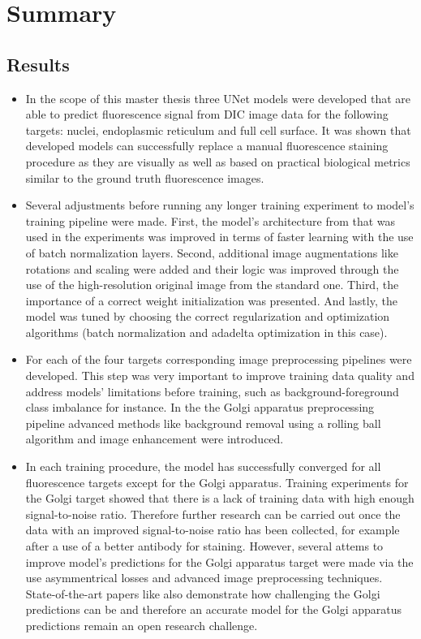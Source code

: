 \section{Summary}
\subsection{Results}
\begin{itemize}
    \item In the scope of this master thesis three UNet models were developed that are able to predict fluorescence signal from DIC image data for the following targets: nuclei, endoplasmic reticulum and full cell surface. It was shown that developed models can successfully replace a manual fluorescence staining procedure as they are visually as well as based on practical biological metrics similar to the ground truth fluorescence images.
    
    \item Several adjustments before running any longer training experiment to model's training pipeline were made. First, the model's architecture from \cite{Lachance_2020} that was used in the experiments was improved in terms of faster learning with the use of batch normalization layers. Second, additional image augmentations like rotations and scaling were added and their logic was improved through the use of the high-resolution original image from the standard one. Third, the importance of a correct weight initialization was presented. And lastly, the model was tuned by choosing the correct regularization and optimization algorithms (batch normalization and adadelta optimization in this case). 
    
    \item For each of the four targets corresponding image preprocessing pipelines were developed. This step was very important to improve training data quality and address models' limitations before training, such as background-foreground class imbalance for instance. In the the Golgi apparatus preprocessing pipeline advanced methods like background removal using a rolling ball algorithm and image enhancement were introduced.
    
    \item In each training procedure, the model has successfully converged for all fluorescence targets except for the Golgi apparatus. Training experiments for the Golgi target showed that there is a lack of training data with high enough signal-to-noise ratio. Therefore further research can be carried out once the data with an improved signal-to-noise ratio has been collected, for example after a use of a better antibody for staining. However, several attems to improve model's predictions for the Golgi apparatus target were made via the use asymmentrical losses and advanced image preprocessing techniques. State-of-the-art papers like \cite{Cheng_2021} also demonstrate how challenging the Golgi predictions can be and therefore an accurate model for the Golgi apparatus predictions remain an open research challenge.
    

\end{itemize}
